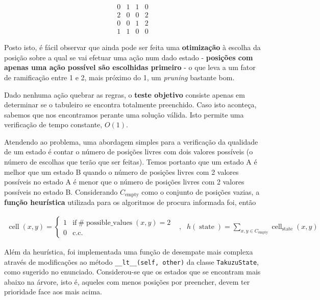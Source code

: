 \documentclass[12pt,a4paper]{article}
\newcommand{\op}{\operatorname}
\begin{document}
\[
  \begin{array}{cccc}
    0 & 1 & 1 & 0 \\
    2 & 0 & 0 & 2 \\
    0 & 0 & 1 & 2 \\
    1 & 1 & 0 & 0
  \end{array}
\]

Posto isto, é fácil observar que ainda pode ser feita uma \textbf{otimização} à escolha da
posição sobre a qual se vai efetuar uma ação num dado estado -
\textbf{posições com apenas uma ação possível são escolhidas primeiro} -
o que leva a um fator de ramificação entre 1 e 2,
mais próximo do 1, um \textit{pruning} bastante bom.

Dado nenhuma ação quebrar as regras, o \textbf{teste objetivo} consiste apenas em determinar
se o tabuleiro se encontra totalmente preenchido. Caso isto aconteça, sabemos que
nos encontramos perante uma solução válida. Isto permite uma verificação de tempo constante, \(O(1)\).

Atendendo ao problema, uma abordagem simples para a verificação da qualidade de
um estado é contar o número de posições livres com dois valores possíveis
(o número de escolhas que terão que ser feitas).
Temos portanto que um estado A é melhor que um estado B quando
o número de posições livres com 2 valores possíveis no estado A é menor que
o número de posições livres com 2 valores possíveis no estado B.
Considerando \(C_{\op{empty}}\) como o conjunto de posições vazias, a
\textbf{função heurística} utilizada para os algoritmos de procura informada foi, então

\[
  \begin{aligned}
    \op{cell}(x, y) = \begin{cases}
                        1 & \text{if}~\#\op{possible\_values}(x, y) = 2 \\
                        0 & \text{c.c.}
                      \end{cases}
     & , &
    h(\op{state}) = \sum_{x,y\in C_{\op{empty}}} \op{cell}_{\op{state}}(x, y)
  \end{aligned}
\]

Além da heurística, foi implementada uma função de desempate mais complexa através de
modificações ao método \texttt{\_\_lt\_\_(self, other)} da classe \texttt{TakuzuState}, como sugerido no enunciado.
Considerou-se que os estados que se encontram mais abaixo na árvore, isto é, aqueles com
menos posições por preencher, devem ter prioridade face aos mais acima.
\end{document}
